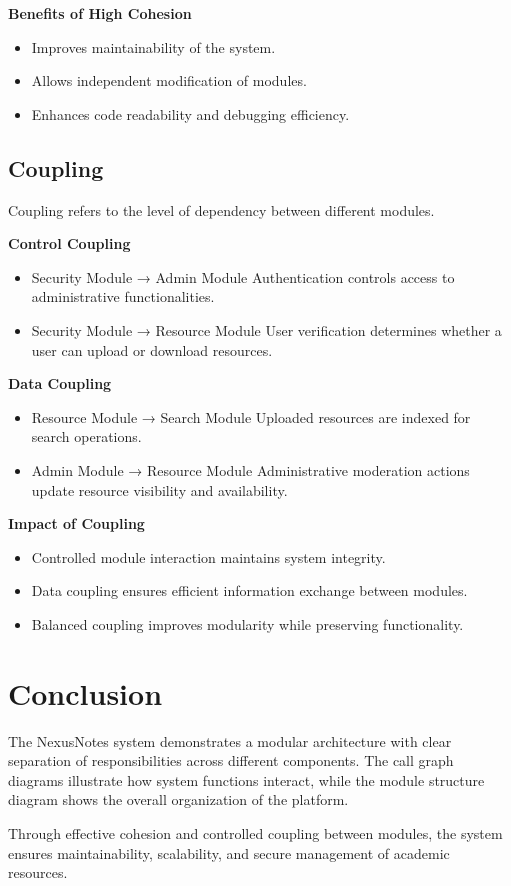 \documentclass[12pt,a4paper]{report}
\begin{document}
\textbf{Benefits of High Cohesion}

\begin{itemize}
\item Improves maintainability of the system.
\item Allows independent modification of modules.
\item Enhances code readability and debugging efficiency.
\end{itemize}

\section{Coupling}

Coupling refers to the level of dependency between different modules.

\textbf{Control Coupling}

\begin{itemize}
\item Security Module → Admin Module  
Authentication controls access to administrative functionalities.
\item Security Module → Resource Module  
User verification determines whether a user can upload or download resources.
\end{itemize}

\textbf{Data Coupling}

\begin{itemize}
\item Resource Module → Search Module  
Uploaded resources are indexed for search operations.
\item Admin Module → Resource Module  
Administrative moderation actions update resource visibility and availability.
\end{itemize}

\textbf{Impact of Coupling}

\begin{itemize}
\item Controlled module interaction maintains system integrity.
\item Data coupling ensures efficient information exchange between modules.
\item Balanced coupling improves modularity while preserving functionality.
\end{itemize}


\chapter{Conclusion}

The NexusNotes system demonstrates a modular architecture with clear separation of responsibilities across different components. The call graph diagrams illustrate how system functions interact, while the module structure diagram shows the overall organization of the platform.

Through effective cohesion and controlled coupling between modules, the system ensures maintainability, scalability, and secure management of academic resources.
\end{document}
